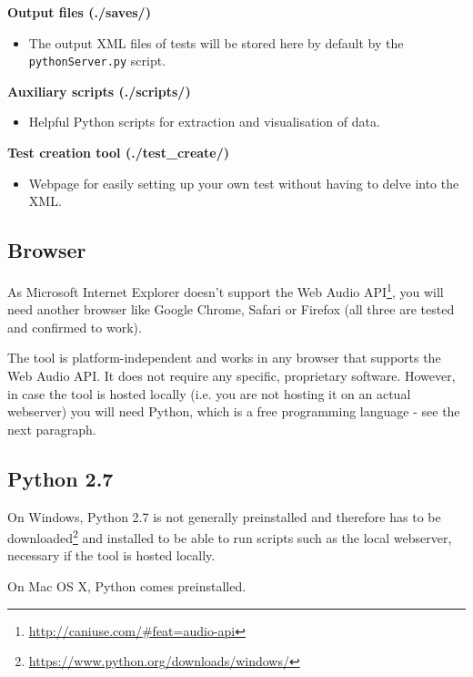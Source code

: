 \documentclass[11pt, oneside]{article}   	%
\begin{document}
          \textbf{Output files (./saves/)}
            	\begin{itemize}
            		\item The output XML files of tests will be stored here by default by the \texttt{pythonServer.py} script.\\ 
            	\end{itemize}
          \textbf{Auxiliary scripts (./scripts/)}
            	\begin{itemize}
            		\item Helpful Python scripts for extraction and visualisation of data.\\ 
            	\end{itemize}
          \textbf{Test creation tool (./test\_create/)}
            	\begin{itemize}
            		\item Webpage for easily setting up your own test without having to delve into the XML.\\ 
            	\end{itemize}
                    	
	\subsection{Browser}
		As Microsoft Internet Explorer doesn't support the Web Audio API\footnote{\url{http://caniuse.com/\#feat=audio-api}}, you will need another browser like Google Chrome, Safari or Firefox (all three are tested and confirmed to work). 
		
		The tool is platform-independent and works in any browser that supports the Web Audio API. It does not require any specific, proprietary software. However, in case the tool is hosted locally (i.e. you are not hosting it on an actual webserver) you will need Python, which is a free programming language - see the next paragraph. 
	
	\subsection{Python 2.7}
		On Windows, Python 2.7 is not generally preinstalled and therefore has to be downloaded\footnote{\url{https://www.python.org/downloads/windows/}} and installed to be able to run scripts such as the local webserver, necessary if the tool is hosted locally. 
		
		On Mac OS X, Python comes preinstalled. 

\clearpage
\end{document}
